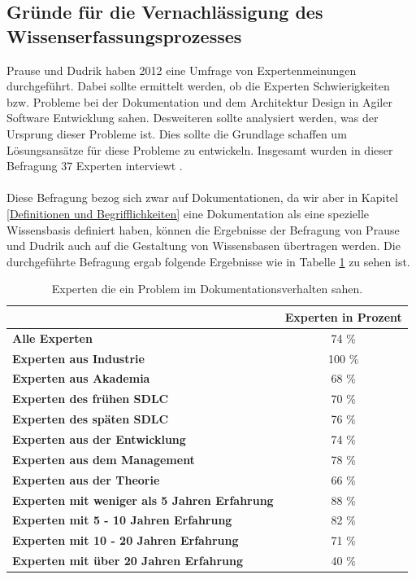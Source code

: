 \documentclass[a4paper,12pt]{scrartcl}
\begin{document}
\subsection{Gründe für die Vernachlässigung des Wissenserfassungsprozesses}
Prause und Dudrik haben 2012 eine Umfrage von Expertenmeinungen durchgeführt. Dabei sollte ermittelt werden, ob die Experten Schwierigkeiten bzw. Probleme bei der Dokumentation und dem Architektur Design in Agiler Software Entwicklung sahen. Desweiteren sollte analysiert werden, was der Ursprung dieser Probleme ist. Dies sollte die Grundlage schaffen um Lösungsansätze für diese Probleme zu entwickeln. Insgesamt wurden in dieser Befragung 37 Experten interviewt \cite{Prause2012}.
\\\\
Diese Befragung bezog sich zwar auf Dokumentationen, da wir aber in Kapitel \ref{Definitionen und Begrifflichkeiten} eine Dokumentation als eine spezielle Wissensbasis definiert haben, können die Ergebnisse der Befragung von Prause und Dudrik auch auf die Gestaltung von Wissensbasen übertragen werden. Die durchgeführte Befragung ergab folgende Ergebnisse wie in Tabelle \ref{ProblemTabelle} zu sehen ist.
\begin{table}[htb]
\begin{tabular}{|l|c|}\hline
\rule{0pt}{15pt}  & \textbf{Experten in Prozent}
\\
\hline
\rule{0pt}{15pt} \textbf{Alle Experten} & 74 \%\\ 
\hline
\rule{0pt}{15pt} \textbf{Experten aus Industrie} & 100 \% \\
\hline
\rule{0pt}{15pt} \textbf{Experten aus Akademia} & 68 \%\\
\hline
\rule{0pt}{15pt} \textbf{Experten des frühen SDLC} & 70 \%\\
\hline
\rule{0pt}{15pt} \textbf{Experten des späten SDLC} & 76 \%\\
\hline
\rule{0pt}{15pt} \textbf{Experten aus der Entwicklung} & 74 \%\\
\hline
\rule{0pt}{15pt} \textbf{Experten aus dem Management} & 78 \%\\
\hline
\rule{0pt}{15pt} \textbf{Experten aus der Theorie} & 66 \%\\
\hline
\rule{0pt}{15pt} \textbf{Experten mit weniger als 5 Jahren Erfahrung} & 88 \%\\
\hline
\rule{0pt}{15pt} \textbf{Experten mit 5 - 10 Jahren Erfahrung} & 82 \%\\
\hline
\rule{0pt}{15pt} \textbf{Experten mit 10 - 20 Jahren Erfahrung} & 71 \%\\
\hline
\rule{0pt}{15pt} \textbf{Experten mit über 20 Jahren Erfahrung} & 40 \%\\
\hline
\end{tabular}
\caption{Experten die ein Problem im Dokumentationsverhalten sahen.}
\label{ProblemTabelle}
\end{table}
\end{document}
